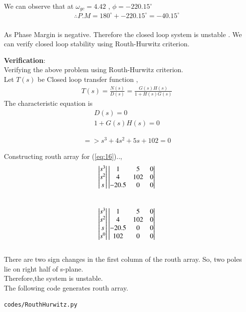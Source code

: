 \begin{enumerate}[label=\thesection.\arabic*.,ref=\thesection.\theenumi]
We can observe that at $\omega_{gc}=4.42$ , $\phi=-220.15^{\circ}$
\\
\begin{align}
\therefore P.M=180^{\circ}+-220.15^{\circ}=-40.15^{\circ} 
\end{align}
\\
As Phase Margin is negative. Therefore the closed loop system is unstable .
We can verify closed loop stability using Routh-Hurwitz criterion.

\textbf{Verification}: \\

Verifying the above problem using Routh-Hurwitz criterion.\\
Let $T(s)$ be Closed loop transfer function ,
\begin{align}
T(s)=\frac{N(s)}{D(s)}=\frac{G(s)H(s)}{1+H(s)G(s)}
\end{align}
The characteristic equation is 
\begin{align}
D(s)=0  \\
1+G(s)H(s)=0 
\end{align}


\begin{align}
=> s^{3}+4s^{2}+5s+102=0   \label{eq:16} 
\end{align}


Constructing routh array for (\ref{eq:16})..,
\begin{align}
\begin{vmatrix}s^3\\s^2\\s\end{vmatrix}
\begin{vmatrix}1 & 5 & 0 \\ 4 & 102 & 0 \\ -20.5 & 0 & 0\end{vmatrix}
\end{align}\\

\begin{align}
\begin{vmatrix}s^3\\s^2\\s\\s^0\end{vmatrix}
\begin{vmatrix}1 & 5 & 0 \\ 4 & 102 & 0 \\ -20.5 & 0 & 0 \\ 102 & 0 & 0\end{vmatrix}
\end{align}\\

There are two sign changes in the first column of the routh array. So, two   poles lie on right half of s-plane. \\
Therefore,the system is unstable.\\
The following code generates routh array.
\begin{lstlisting}
codes/RouthHurwitz.py
\end{lstlisting}


\end{enumerate}
